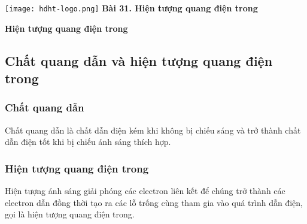 \newcommand{\chapter}[2][]{
	\newcommand{\chapname}{#2}
	\begin{flushleft}
		\begin{minipage}[t]{\linewidth}
			\texttt{[image: hdht-logo.png]}
			\hspace{0pt}	
			\sffamily\bfseries\large Bài  31. Hiện tượng quang điện trong
			\begin{flushleft}
				\huge\bfseries #1
			\end{flushleft}
		\end{minipage}
	\end{flushleft}
	\vspace{1cm}
	\normalfont\normalsize
}
\chapter[Hiện tượng quang điện trong]{Hiện tượng quang điện trong}


\subsection{Chất quang dẫn và hiện tượng quang điện trong}
\subsubsection{Chất quang dẫn}
Chất quang dẫn là chất dẫn điện kém khi không bị chiếu sáng và trở thành chất dẫn điện tốt khi bị chiếu ánh sáng thích hợp.
\subsubsection{Hiện tượng quang điện trong}
Hiện tượng ánh sáng giải phóng các electron liên kết để chúng trở thành các electron dẫn đồng thời tạo ra các lỗ trống cùng tham gia vào quá trình dẫn điện, gọi là hiện tượng quang điện trong.
